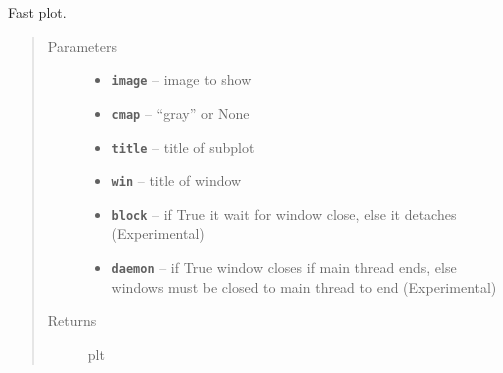 \documentclass[letterpaper,10pt,english]{sphinxmanual}
\begin{document}
\begin{fulllineitems}
\label{RRtoolbox.lib:RRtoolbox.lib.plotter.fastplt}
Fast plot.
\begin{quote}\begin{description}
\item[{Parameters}] \leavevmode\begin{itemize}
\item {} 
\textbf{\texttt{image}} -- image to show

\item {} 
\textbf{\texttt{cmap}} -- ``gray'' or None

\item {} 
\textbf{\texttt{title}} -- title of subplot

\item {} 
\textbf{\texttt{win}} -- title of window

\item {} 
\textbf{\texttt{block}} -- if True it wait for window close, else it detaches (Experimental)

\item {} 
\textbf{\texttt{daemon}} -- if True window closes if main thread ends, else windows
must be closed to main thread to end (Experimental)

\end{itemize}

\item[{Returns}] \leavevmode
plt

\end{description}\end{quote}

\end{fulllineitems}

\end{document}
